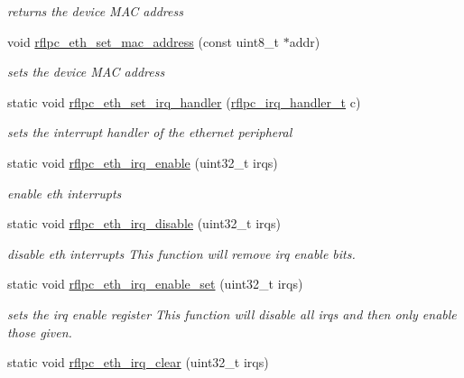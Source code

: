 \begin{DoxyCompactItemize}
\begin{DoxyCompactList}\small\item\em returns the device M\-A\-C address \end{DoxyCompactList}\item 
\hypertarget{group__eth_ga2633bf7b80203a508a27023ca48ec075}{void \hyperlink{group__eth_ga2633bf7b80203a508a27023ca48ec075}{rflpc\-\_\-eth\-\_\-set\-\_\-mac\-\_\-address} (const uint8\-\_\-t $\ast$addr)}\label{group__eth_ga2633bf7b80203a508a27023ca48ec075}

\begin{DoxyCompactList}\small\item\em sets the device M\-A\-C address \end{DoxyCompactList}\item 
\hypertarget{group__eth_ga38c78af70094bbb49498aef4e6c9603f}{static void \hyperlink{group__eth_ga38c78af70094bbb49498aef4e6c9603f}{rflpc\-\_\-eth\-\_\-set\-\_\-irq\-\_\-handler} (\hyperlink{group__irq_ga4970a8a2cf9b63e4c261982504669a1f}{rflpc\-\_\-irq\-\_\-handler\-\_\-t} c)}\label{group__eth_ga38c78af70094bbb49498aef4e6c9603f}

\begin{DoxyCompactList}\small\item\em sets the interrupt handler of the ethernet peripheral \end{DoxyCompactList}\item 
static void \hyperlink{group__eth_gacbbf829ec0b5c6e2af80d57c51cce14d}{rflpc\-\_\-eth\-\_\-irq\-\_\-enable} (uint32\-\_\-t irqs)
\begin{DoxyCompactList}\small\item\em enable eth interrupts \end{DoxyCompactList}\item 
static void \hyperlink{group__eth_ga19e9700bec67106ddcf68a56c945e4d4}{rflpc\-\_\-eth\-\_\-irq\-\_\-disable} (uint32\-\_\-t irqs)
\begin{DoxyCompactList}\small\item\em disable eth interrupts This function will remove irq enable bits. \end{DoxyCompactList}\item 
static void \hyperlink{group__eth_gaa56203b703266060ea2567eac82418c9}{rflpc\-\_\-eth\-\_\-irq\-\_\-enable\-\_\-set} (uint32\-\_\-t irqs)
\begin{DoxyCompactList}\small\item\em sets the irq enable register This function will disable all irqs and then only enable those given. \end{DoxyCompactList}\item 
\hypertarget{group__eth_ga028dc9a4647329b5c075c2f4b8cec83d}{static void \hyperlink{group__eth_ga028dc9a4647329b5c075c2f4b8cec83d}{rflpc\-\_\-eth\-\_\-irq\-\_\-clear} (uint32\-\_\-t irqs)}\label{group__eth_ga028dc9a4647329b5c075c2f4b8cec83d}


\end{DoxyCompactItemize}
